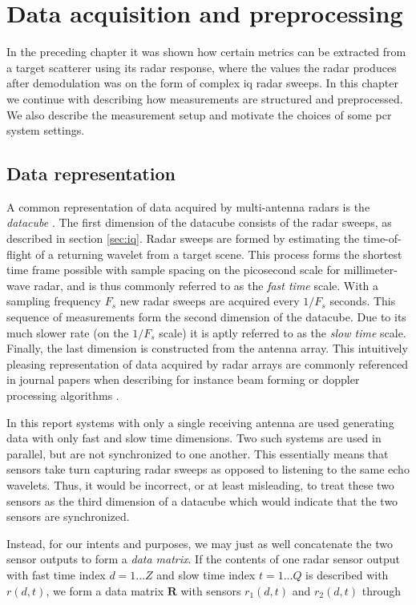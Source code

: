 \chapter{Data acquisition and preprocessing}

In the preceding chapter it was shown how certain metrics can be extracted from a target scatterer using its radar response, where the values the radar produces after demodulation was on the form of complex \gls{iq} radar sweeps. In this chapter we continue with describing how measurements are structured and preprocessed. We also describe the measurement setup and motivate the choices of some \gls{pcr} system settings.

\section{Data representation}

A common representation of data acquired by multi-antenna radars is the \emph{datacube} \citep{richards_2014}. The first dimension of the datacube consists of the radar sweeps, as described in section \ref{sec:iq}. Radar sweeps are formed by estimating the time-of-flight of a returning wavelet from a target scene. This process forms the shortest time frame possible with sample spacing on the picosecond scale for millimeter-wave radar, and is thus commonly referred to as the \emph{fast time} scale. With a sampling frequency $F_s$ new radar sweeps are acquired every $1/F_s$ seconds. This sequence of measurements form the second dimension of the datacube. Due to its much slower rate (on the $1/F_s$ scale) it is aptly referred to as the \emph{slow time} scale. Finally, the last dimension is constructed from the antenna array. This intuitively pleasing representation of data acquired by radar arrays are commonly referenced in journal papers when describing for instance beam forming or doppler processing algorithms \citep{gentile_donovan_2018}. 

In this report systems with only a single receiving antenna are used generating data with only fast and slow time dimensions. Two such systems are used in parallel, but are not synchronized to one another. This essentially means that sensors take turn capturing radar sweeps as opposed to listening to the same echo wavelets. Thus, it would be incorrect, or at least misleading, to treat these two sensors as the third dimension of a datacube which would indicate that the two sensors are synchronized. 

Instead, for our intents and purposes, we may just as well concatenate the two sensor outputs to form a \emph{data matrix}. If the contents of one radar sensor output with fast time index $d=1...Z$ and slow time index $t=1...Q$ is described with $r(d,t)$, we form a data matrix $\mathbf{R}$ with sensors $r_1(d,t)$ and $r_2(d,t)$ through

